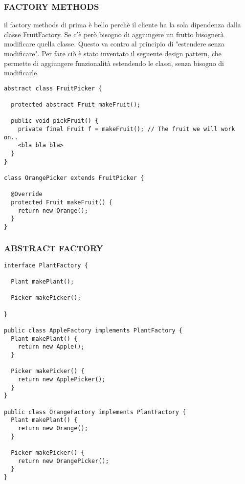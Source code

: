 \subsubsection{FACTORY METHODS}
\noindent il factory  methods di prima è bello perchè il cliente ha la sola dipendenza dalla classe FruitFactory. Se c'è però bisogno di aggiungere un frutto bisognerà modificare quella classe. Questo va contro al principio di "estendere senza modificare". Per fare ciò è stato inventato il seguente design pattern, che permette di aggiungere funzionalità estendendo le classi, senza bisogno di modificarle.
\begin{lstlisting}
abstract class FruitPicker {

  protected abstract Fruit makeFruit();

  public void pickFruit() {
    private final Fruit f = makeFruit(); // The fruit we will work on..
    <bla bla bla>
  }
}

class OrangePicker extends FruitPicker {

  @Override
  protected Fruit makeFruit() {
    return new Orange();
  }
}
\end{lstlisting}

\subsubsection{ABSTRACT FACTORY}
\begin{lstlisting}
interface PlantFactory {

  Plant makePlant();

  Picker makePicker(); 

}

public class AppleFactory implements PlantFactory {
  Plant makePlant() {
    return new Apple();
  }

  Picker makePicker() {
    return new ApplePicker();
  }
}

public class OrangeFactory implements PlantFactory {
  Plant makePlant() {
    return new Orange();
  }

  Picker makePicker() {
    return new OrangePicker();
  }
}
\end{lstlisting}

